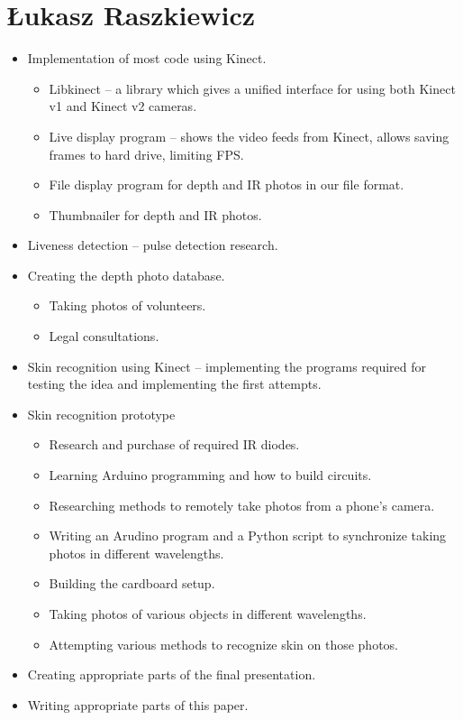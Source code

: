     \section{Łukasz Raszkiewicz}
        \begin{itemize}
            \item Implementation of most code using Kinect.
            \begin{itemize}
                \item Libkinect -- a library which gives a unified interface for
                using both Kinect v1 and Kinect v2 cameras.
                \item Live display program -- shows the video feeds from Kinect,
                allows saving frames to hard drive, limiting FPS.
                \item File display program for depth and IR photos in our file format.
                \item Thumbnailer for depth and IR photos.
            \end{itemize}
            \item Liveness detection -- pulse detection research.
            \item Creating the depth photo database.
            \begin{itemize}
                \item Taking photos of volunteers.
                \item Legal consultations.
            \end{itemize}
            \item Skin recognition using Kinect -- implementing the programs required
            for testing the idea and implementing the first attempts.
            \item Skin recognition prototype
            \begin{itemize}
                \item Research and purchase of required IR diodes.
                \item Learning Arduino programming and how to build circuits.
                \item Researching methods to remotely take photos from a phone's camera.
                \item Writing an Arudino program and a Python script to synchronize
                taking photos in different wavelengths.
                \item Building the cardboard setup.
                \item Taking photos of various objects in different wavelengths.
                \item Attempting various methods to recognize skin on those photos.
            \end{itemize}
            \item Creating appropriate parts of the final presentation.
            \item Writing appropriate parts of this paper.
        \end{itemize}

